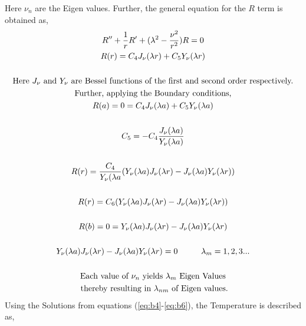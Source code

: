 Here $\nu_n$ are the Eigen values. Further, the general equation for the $R$ term is obtained as,
\begin{equation}
    \label{eq:b6}
    \begin{gathered}
    R''+\frac{1}{r}R'+(\lambda^2-\frac{\nu^2}{r^2})R=0
    \\
    R(r)=C_4J_\nu(\lambda r)+C_5 Y_\nu(\lambda r)\\
    \\
    $Here $J_\nu$ and $Y_\nu$ are Bessel functions of the first and second order respectively.$\\
    $Further, applying the Boundary conditions,$\\
    R(a)=0=C_4J_\nu(\lambda a)+C_5Y_\nu(\lambda a)\\
    \\
    C_5=-C_4\frac{J_\nu(\lambda a)}{Y_\nu(\lambda a)}\\
    \\
    R(r)=\frac{C_4}{Y_\nu(\lambda a}(Y_\nu(\lambda a) J_\nu(\lambda r)-J_\nu(\lambda a)Y_\nu(\lambda r))\\
    \\
     R(r)=C_6(Y_\nu(\lambda a) J_\nu(\lambda r)-J_\nu(\lambda a)Y_\nu(\lambda r))\\
     \\
     R(b)=0=Y_\nu(\lambda a) J_\nu(\lambda r)-J_\nu(\lambda a)Y_\nu(\lambda r)\\
     \\
     Y_\nu(\lambda a) J_\nu(\lambda r)-J_\nu(\lambda a)Y_\nu(\lambda r)=0 \hspace{1cm} \lambda_m=1,2,3...\\
     \\
     $Each value of $\nu_n$ yields $\lambda_m$ Eigen Values$\\
     $ thereby resulting in $\lambda_{nm}$ of Eigen values.$
    \end{gathered}
\end{equation}
Using the Solutions from equations (\ref{eq:b4}-\ref{eq:b6}), the Temperature is described as,

